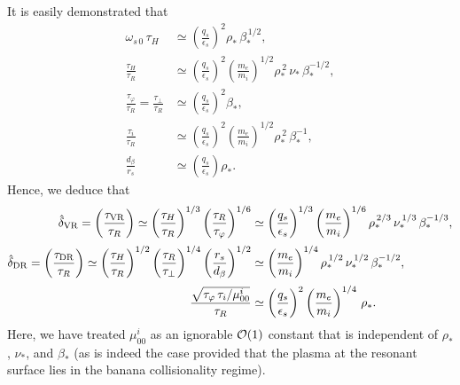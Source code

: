 \documentclass[12pt,prb,aps]{revtex4-1}
\begin{document}
It is easily demonstrated that
\begin{align}
\omega_{s\,0}\,\tau_H&\simeq \left(\frac{q_s}{\epsilon_s}\right)^2\rho_\ast\,\beta_\ast^{\,1/2},\\[0.5ex]
\frac{\tau_H}{\tau_R}&\simeq \left(\frac{q_s}{\epsilon_s}\right)^2\left(\frac{m_e}{m_i}\right)^{1/2}\rho_\ast^{\,2}\,\nu_\ast\,\beta_\ast^{-1/2},\\[0.5ex]
\frac{\tau_\varphi}{\tau_R} = \frac{\tau_\perp}{\tau_R} &\simeq \left(\frac{q_s}{\epsilon_s}\right)^2\beta_\ast,\\[0.5ex]
\frac{\tau_i}{\tau_R} &\simeq  \left(\frac{q_s}{\epsilon_s}\right)^2\left(\frac{m_e}{m_i}\right)^{1/2}\rho_\ast^{\,2}\,\beta_\ast^{-1},\\[0.5ex]
\frac{d_\beta}{r_s} &\simeq \left(\frac{q_s}{\epsilon_s}\right)\rho_\ast.
\end{align} 
Hence, we deduce that 
\begin{align}
\hat{\delta}_{\rm VR} = \left(\frac{\tau_{\rm VR}}{\tau_R}\right) \simeq\left(\frac{\tau_H}{\tau_R}\right)^{1/3}\left(\frac{\tau_R}{\tau_\varphi}\right)^{1/6}&\simeq \left(\frac{q_s}{\epsilon_s}\right)^{1/3}\left(\frac{m_e}{m_i}\right)^{1/6}\rho_\ast^{\,2/3}\,\nu_\ast^{\,1/3}\,\beta_\ast^{-1/3},\\[0.5ex]
\hat{\delta}_{\rm DR} = \left(\frac{\tau_{\rm DR}}{\tau_R}\right) \simeq \left(\frac{\tau_H}{\tau_R}\right)^{1/2}\left(\frac{\tau_R}{\tau_\perp}\right)^{1/4}\left(\frac{r_s}{d_\beta}\right)^{1/2}&\simeq \left(\frac{m_e}{m_i}\right)^{1/4}\rho_\ast^{\,1/2}\,\nu_\ast^{\,1/2}\,\beta_\ast^{-1/2},\\[0.5ex]
\frac{\sqrt{\tau_\varphi\, \tau_i/\mu_{00}^i}}{\tau_R}&\simeq \left(\frac{q_s}{\epsilon_s}\right)^2\left(\frac{m_e}{m_i}\right)^{1/4}\,\rho_\ast.
\end{align}
Here, we have treated $\mu_{00}^i$ as an ignorable ${\cal O}(1)$ constant that is independent of $\rho_\ast$, $\nu_\ast$, and
$\beta_\ast$ (as is indeed the case provided that the plasma at the resonant surface lies in the banana collisionality regime).\cite{hs} 
\end{document}
